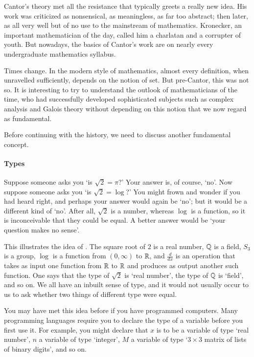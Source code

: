 Cantor's theory met all the resistance that typically greets a really new
idea.  His work was criticized as nonsensical, as meaningless, as far too
abstract; then later, as all very well but of no use to the mainstream of
mathematics.  Kronecker,%
%
%
an important mathematician of the day, called him a charlatan and a
corrupter of youth.  But nowadays, the basics of Cantor's work are on
nearly every undergraduate mathematics syllabus.

Times change.  In the modern style of mathematics, almost every definition,
when unravelled sufficiently, depends on the notion of set.  But
pre-Cantor, this was not so.  It is interesting to try to understand the
outlook of mathematicians of the time, who had successfully developed
sophisticated subjects such as complex analysis and Galois theory without
depending on this notion that we now regard as fundamental.

Before continuing with the history, we need to discuss another fundamental
concept.

\paragraph*{Types}  
%
%
Suppose someone asks you `is $\sqrt{2} = \pi$?'  Your answer is, of course,
`no'.  Now suppose someone asks you `is $\sqrt{2} = \log$?'  You might
frown and wonder if you had heard right, and perhaps your answer would
again be `no'; but it would be a different kind of `no'.  After all,
$\sqrt{2}$ is a number, whereas $\log$ is a function, so it is
inconceivable that they could be equal.  A better answer would be `your
question makes no sense'.

This illustrates the idea of .  The square root of $2$ is a
real number, $\mathbb{Q}$ is a field, $S_3$ is a group, $\log$ is a
function from $(0, \infty)$ to $\mathbb{R}$, and $\frac{d}{dx}$ is an operation
that takes as input one function from $\mathbb{R}$ to $\mathbb{R}$ and produces as
output another such function.  One says that the type of $\sqrt{2}$ is
`real number', the type of $\mathbb{Q}$ is `field', and so on.  We all have
an inbuilt sense of type, and it would not usually occur to us to ask
whether two things of different type were equal.

You may have met this idea before if you have programmed computers.%
%
%
Many programming languages require you to declare the type of a variable
before you first use it.  For example, you might declare that $x$ is to be
a variable of type `real number', $n$ a variable of type `integer', $M$ a
variable of type `$3 \times 3$ matrix of lists of binary digits', and so
on.

